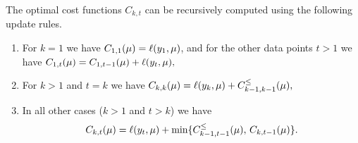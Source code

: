 \documentclass[twoside,11pt]{article}
\begin{document}
\begin{theorem}
\label{thm:gpdpa}
  The optimal cost functions $C_{k,t}$ can be recursively computed
  using the following update rules.
\begin{enumerate}
\item For $k=1$ we have
$C_{1,1}(\mu)=\ell(y_1,\mu)$, and for the other data
  points $t>1$ we have
$
C_{1,t}(\mu)=C_{1,t-1}(\mu)+\ell(y_t,\mu),
$
\item For $k>1$ and $t=k$ we have
$
  C_{k,k}(\mu)=\ell(y_k, \mu)+C_{k-1,k-1}^\leq(\mu),
$
\item In all other cases ($k>1$ and $t>k$) we have
 $$
  C_{k,t}(\mu)=\ell(y_t,\mu)+
  \min\{
  C_{k-1,t-1}^\leq(\mu),\,
  C_{k,t-1}(\mu)
  \}.
$$
\end{enumerate}
\end{theorem}
\end{document}

